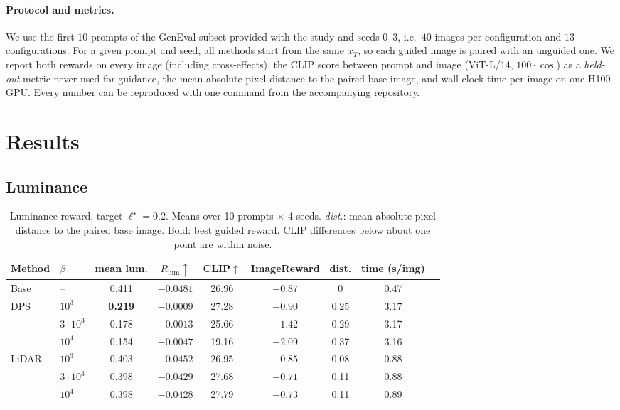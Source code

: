 \documentclass[11pt]{article}
\begin{document}
\paragraph{Protocol and metrics.} We use the first $10$ prompts of the GenEval \citep{ghosh2023geneval} subset provided with the study and seeds $0$--$3$, i.e.\ $40$ images per configuration and $13$ configurations. For a given prompt and seed, all methods start from the same $x_T$, so each guided image is paired with an unguided one. We report both rewards on every image (including cross-effects), the CLIP score \citep{radford2021clip, hessel2021clipscore} between prompt and image (ViT-L/14, $100\cdot\cos$) as a \emph{held-out} metric never used for guidance, the mean absolute pixel distance to the paired base image, and wall-clock time per image on one H100 GPU. Every number can be reproduced with one command from the accompanying repository.

\section{Results}
\label{sec:results}

\subsection{Luminance}

\begin{table}[t]
\centering
\caption{Luminance reward, target $\ell^\star=0.2$. Means over 10 prompts $\times$ 4 seeds. \emph{dist.}: mean absolute pixel distance to the paired base image. Bold: best guided reward. CLIP differences below about one point are within noise.}
\label{tab:lum}
\small
\begin{tabular}{llccccccc}
\toprule
Method & $\beta$ & mean lum. & $R_{\mathrm{lum}}\uparrow$ & CLIP$\uparrow$ & ImageReward & dist. & time (s/img) \\
\midrule
Base & -- & 0.411 & $-0.0481$ & 26.96 & $-0.87$ & 0 & 0.47 \\
\midrule
\multirow{3}{*}{DPS} & $10^3$ & \textbf{0.219} & $\bm{-0.0009}$ & 27.28 & $-0.90$ & 0.25 & 3.17 \\
 & $3\cdot10^3$ & 0.178 & $-0.0013$ & 25.66 & $-1.42$ & 0.29 & 3.17 \\
 & $10^4$ & 0.154 & $-0.0047$ & 19.16 & $-2.09$ & 0.37 & 3.16 \\
\midrule
\multirow{3}{*}{LiDAR} & $10^3$ & 0.403 & $-0.0452$ & 26.95 & $-0.85$ & 0.08 & 0.88 \\
 & $3\cdot10^3$ & 0.398 & $-0.0429$ & 27.68 & $-0.71$ & 0.11 & 0.88 \\
 & $10^4$ & 0.398 & $-0.0428$ & 27.79 & $-0.73$ & 0.11 & 0.89 \\
\bottomrule
\end{tabular}
\end{table}
\end{document}

